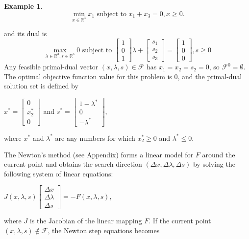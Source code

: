 \documentclass[a4paper,10 pt,titlepage,twoside]{book}
\theoremstyle{plain}
\theoremstyle{definition}
\newtheorem{ex}[thm]{Example}
\theoremstyle{remark}
\begin{document}
\begin{ex}
	\begin{equation*}
	\min\limits_{x\in\mathbb{R}^{3}} x_{1} \text{ subject to }x_{1} + x_{3} = 0, x\geq0.
	\end{equation*}

and its dual is 
	\begin{equation*}
\max\limits_{\lambda\in\mathbb{R}^{3}, s\in\mathbb{R}^{3}} 0 \text{ subject to } \begin{bmatrix}1\\0\\1\end{bmatrix}\lambda+\begin{bmatrix}
s_{1}\\s_{2}\\s_{3}
\end{bmatrix}=\begin{bmatrix}1\\0\\0\end{bmatrix}, s\geq0 
\end{equation*}
Any feasible primal-dual vector $(x, \lambda, s)\in\mathcal{F}$ has $x_{1}= x_{2}= s_{2}= 0$, so $\mathcal{F}^{0}=\emptyset$. The optimal objective function value for this problem is 0, and the primal-dual solution set is defined by
\begin{center}
$x^{*} = \begin{bmatrix}
0\\x^{*}_{2}\\ 0
\end{bmatrix}$ and $s^{*}=\begin{bmatrix}
1-\lambda^{*}\\0\\-\lambda^{*}
\end{bmatrix}$,  
\end{center}
where $x^{*}$ and $\lambda^{*}$ are any numbers for which $x_{2}^{*}\geq0$ and $\lambda^{*}\leq0$.
\end{ex}
The Newton's method (see Appendix) forms a linear model for $\mathit{F}$ around the current point and obtains the search direction $(\Delta x,\Delta \lambda,\Delta s)$ by solving the following system of linear equations:
\begin{center}
	$\mathit{J}(x,\lambda,s)\begin{bmatrix}
	\Delta x\\\Delta\lambda \\\Delta s
	\end{bmatrix}=-\mathit{F}(x,\lambda,s)$,
\end{center}
where $\mathit{J}$ is the Jacobian of the linear mapping $\mathit{F}$. If the current point $(x, \lambda, s)\notin\mathcal{F}$, the Newton step equations becomes
\end{document}
